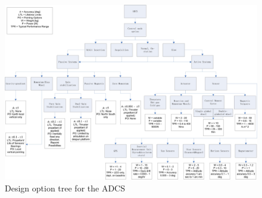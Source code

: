 \begin{figure}
\centering
\includegraphics[width=1.0\textwidth, angle=90]{chapters/img/DOTadcs.png}
\caption{Design option tree for the \ac{ADCS}}
\label{pic_DOTadcs}
\end{figure}